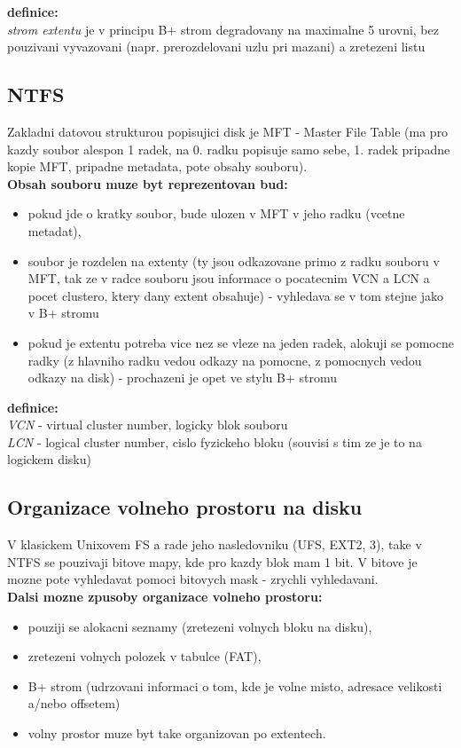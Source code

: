 \documentclass[a4paper, 11pt]{article}
\begin{document}
\textbf{definice:} \\[0.5em]
\textit{strom extentu} je v principu B+ strom degradovany na maximalne 5 urovni, bez pouzivani vyvazovani (napr. prerozdelovani uzlu pri mazani) a zretezeni listu \\

\subsection{NTFS}
Zakladni datovou strukturou popisujici disk je MFT - Master File Table (ma pro kazdy soubor alespon 1 radek, na 0. radku popisuje samo sebe, 1. radek pripadne kopie MFT, pripadne metadata, pote obsahy souboru).  \\

\textbf{Obsah souboru muze byt reprezentovan bud:}
\begin{itemize}
    \item pokud jde o kratky soubor, bude ulozen v MFT v jeho radku (vcetne metadat),
    \item soubor je rozdelen na extenty (ty jsou odkazovane primo z radku souboru v MFT, tak ze v radce souboru jsou informace o pocatecnim VCN a LCN a pocet clustero, ktery dany extent obsahuje) - vyhledava se v tom stejne jako v B+ stromu
    \item pokud je extentu potreba vice nez se vleze na jeden radek, alokuji se pomocne radky (z hlavniho radku vedou odkazy na pomocne, z pomocnych vedou odkazy na disk) - prochazeni je opet ve stylu B+ stromu \\
\end{itemize}

\textbf{definice:} \\[0.5em]
\textit{VCN} - virtual cluster number, logicky blok souboru \\[0.2em]
\textit{LCN} - logical cluster number, cislo fyzickeho bloku (souvisi s tim ze je to na logickem disku) \\

\subsection{Organizace volneho prostoru na disku}
V klasickem Unixovem FS a rade jeho nasledovniku (UFS, EXT2, 3), take v NTFS se pouzivaji bitove mapy, kde pro kazdy blok mam 1 bit. V bitove je mozne pote vyhledavat pomoci bitovych mask - zrychli vyhledavani. \\

\textbf{Dalsi mozne zpusoby organizace volneho prostoru:}
\begin{itemize}
    \item pouziji se alokacni seznamy (zretezeni volnych bloku na disku),
    \item zretezeni volnych polozek v tabulce (FAT),
    \item B+ strom (udrzovani informaci o tom, kde je volne misto, adresace velikosti a/nebo offsetem)
    \item volny prostor muze byt take organizovan po extentech. \\
\end{itemize}
\end{document}
